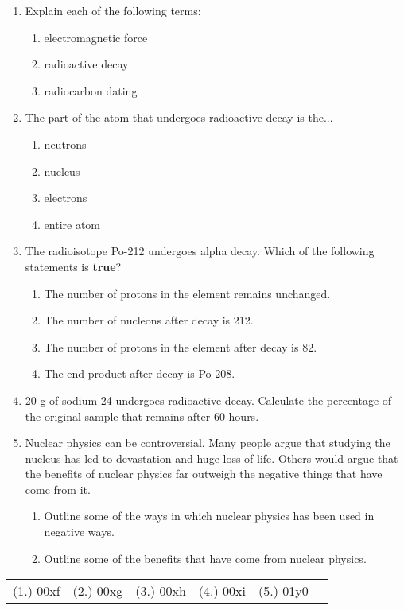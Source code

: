 \begin{eocexercises}{}

\begin{enumerate}
\item{Explain each of the following terms:}
\begin{enumerate}
\item{electromagnetic force}
\item{radioactive decay}
\item{radiocarbon dating}
\end{enumerate}

\item{The part of the atom that undergoes radioactive decay is the...
\begin{enumerate}
\item{neutrons}
\item{nucleus}
\item{electrons}
\item{entire atom}
\end{enumerate}
}
\item{The radioisotope Po-212 undergoes alpha decay. Which of the following statements is \textbf{true}?
\begin{enumerate}
\item{The number of protons in the element remains unchanged.}
\item{The number of nucleons after decay is 212.}
\item{The number of protons in the element after decay is 82.}
\item{The end product after decay is Po-208.}
\end{enumerate}
}


\item{20 g of sodium-24 undergoes radioactive decay. Calculate the percentage of the original sample that remains after 60 hours.}

\item{Nuclear physics can be controversial. Many people argue that studying the nucleus has led to devastation and huge loss of life. Others would argue that the benefits of nuclear physics far outweigh the negative things that have come from it.}
\begin{enumerate}
\item{Outline some of the ways in which nuclear physics has been used in negative ways.}
\item{Outline some of the benefits that have come from nuclear physics.}
\end{enumerate}
\end{enumerate}

\practiceinfo

\begin{tabular}[h]{cccccc}
(1.) 00xf & (2.) 00xg & (3.) 00xh & (4.) 00xi & (5.) 01y0 &
 \end{tabular}
\end{eocexercises}









